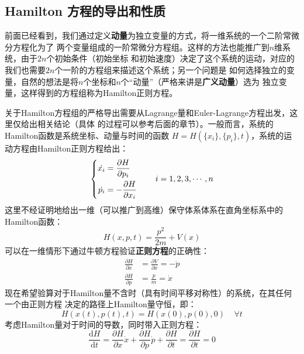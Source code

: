     \subsection{Hamilton 方程的导出和性质}
    前面已经看到，我们通过定义\textbf{动量}为独立变量的方式，将一维系统的一个二阶常微分方程化为了
    两个变量组成的一阶常微分方程组。这样的方法也能推广到$n$维系统，由于$2n$个初始条件（初始坐标
    和初始速度）决定了这个系统的运动，对应的我们也需要$2n$个一阶的方程组来描述这个系统；另一个问题是
    如何选择独立的变量，自然的想法是将$n$个坐标和$n$个“动量”（严格来讲是\textbf{广义动量}）选为
    独立变量，这样得到的方程组称为Hamilton正则方程。
    \par 
    关于Hamilton方程组的严格导出需要从Lagrange量和Euler-Lagrange方程出发，这里仅给出相关结论（具体
    的过程可以参考后面的章节）。一般而言，系统的Hamilton函数是系统坐标、动量与时间的函数
    $H = H(\{x_i\},\{p_i\},t)$，系统的运动方程由Hamilton正则方程给出：
    \begin{equation}
        \left\{
            \begin{split}
                \dot{x_{i}} &= \frac{\partial{H}}{\partial{p_i}}\\
                \dot{p_{i}} &= -\frac{\partial{H}}{\partial{x_{i}}}
            \end{split}
        \right.
        \quad\quad
        i = 1, 2, 3, \cdots, n
        \label{Hamilton equation}
    \end{equation}
    这里不经证明地给出一维（可以推广到高维）保守体系体系在直角坐标系中的Hamilton函数：
    \begin{equation}
        H(x,p,t) = \frac {p^2}{2m} + V(x)
    \end{equation}
    可以在一维情形下通过牛顿方程验证\textbf{正则方程}的正确性：
    \begin{equation}
        \begin{split}
        \frac {\partial H}{\partial x} &= \frac {\partial V}{\partial x} = -\dot{p}\\
        \frac {\partial H}{\partial p} &= \frac pm = \dot{x}
        \end{split}
    \end{equation}
    现在希望验算对于Hamilton量不含时（具有时间平移对称性）的系统，在其任何一个由正则方程
    决定的路径上Hamilton量守恒，即：
    \begin{equation}
        H(x(t),p(t),t) = H(x(0),p(0),0)~~~~~\forall t
    \end{equation}
    考虑Hamilton量对于时间的导数，同时带入正则方程：
    \begin{equation}
        \frac {\mathrm{d}H}{\mathrm{d}t} = \frac {\partial H}{\partial x} \dot{x} + \frac {\partial H}{\partial p} \dot{p} + \frac {\partial H}{\partial t} = \frac {\partial H}{\partial t} = 0
    \end{equation}
